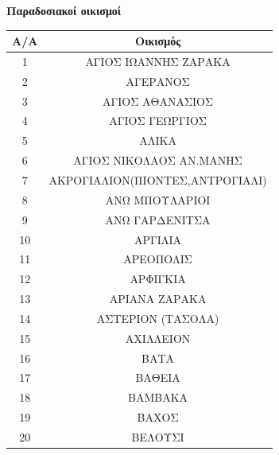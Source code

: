 \documentclass[12pt]{article}
\begin{document}
	\textbf{Παραδοσιακοί οικισμοί}
	\begin{table}[H]
		\centering
		\begin{tabular}{|c|c|}
			\hline
			\textbf{Α/Α} & \textbf{Οικισμός} \\ \hline
			1 & ΑΓΙΟΣ ΙΩΑΝΝΗΣ ΖΑΡΑΚΑ \\ \hline
			2 & ΑΓΕΡΑΝΟΣ \\ \hline
			3 & ΑΓΙΟΣ ΑΘΑΝΑΣΙΟΣ \\ \hline
			4 & ΑΓΙΟΣ ΓΕΩΡΓΙΟΣ \\ \hline
			5 & ΑΛΙΚΑ \\ \hline
			6 & ΑΓΙΟΣ ΝΙΚΟΛΑΟΣ ΑΝ.ΜΑΝΗΣ \\ \hline
			7 & ΑΚΡΟΓΙΑΛΙΟΝ(ΠΙΟΝΤΕΣ,ΑΝΤΡΟΓΙΑΛΙ) \\ \hline
			8 & ΑΝΩ ΜΠΟΥΛΑΡΙΟΙ \\ \hline
			9 & ΑΝΩ ΓΑΡΔΕΝΙΤΣΑ \\ \hline
			10 & ΑΡΓΙΛΙΑ \\ \hline
			11 & ΑΡΕΟΠΟΛΙΣ \\ \hline
			12 & ΑΡΦΙΓΚΙΑ \\ \hline
			13 & ΑΡΙΑΝΑ ΖΑΡΑΚΑ \\ \hline
			14 & ΑΣΤΕΡΙΟΝ (ΤΑΣΟΛΑ) \\ \hline
			15 & ΑΧΙΛΛΕΙΟΝ \\ \hline
			16 & ΒΑΤΑ \\ \hline
			17 & ΒΑΘΕΙΑ \\ \hline
			18 & ΒΑΜΒΑΚΑ \\ \hline
			19 & ΒΑΧΟΣ \\ \hline
			20 & ΒΕΛΟΥΣΙ \\ \hline
		\end{tabular}
	\end{table}
	
\end{document}
